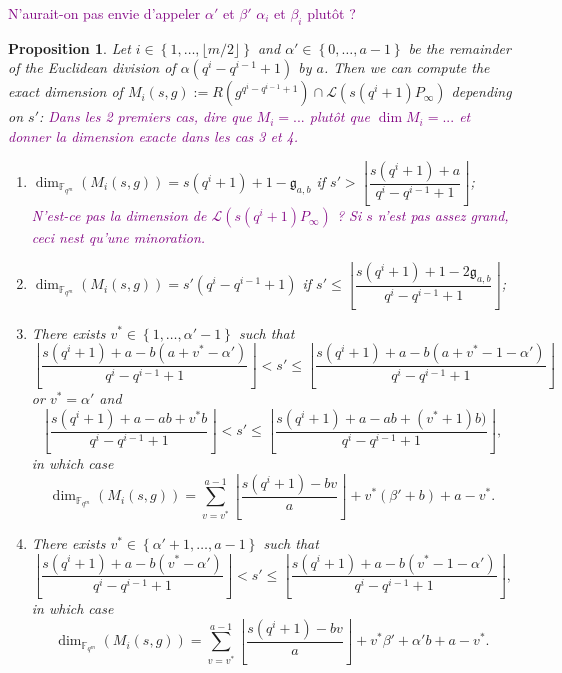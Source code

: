\documentclass[a4paper]{article}
\newtheorem{proposition}[thm]{Proposition}
\theoremstyle{definition}
\theoremstyle{remark}
\newcommand{\calL}{\mathcal{L}}
\newcommand{\fqm}{\mathbb{F}_{q^m}}
\newcommand{\set}[1]{\left\{#1\right\}}
\newcommand\jade[1]{\textcolor{purple}{#1}}
\begin{document}
\jade{N'aurait-on pas envie d'appeler $\alpha'$ et $\beta'$ $\alpha_i$ et $\beta_i$ plutôt ?}
\begin{proposition} \label{prop:dim_M_i's}
Let $i \in \set{1,\dots,\lfloor m/2 \rfloor}$ and
     $\alpha' \in \set{0,\dots,a-1}$ be the remainder of the Euclidean division of $\alpha (q^i-q^{i-1}+1)$ by $a$. Then we can compute the exact dimension of $M_i(s,g) := R(g^{q^{i}-q^{i-1}+1}) \cap \calL(s(q^i+1)P_\infty)$ depending on $s'$:
     \jade{Dans les 2 premiers cas, dire que $M_i=...$ plutôt que $\dim M_i=...$ et donner la dimension exacte dans les cas 3 et 4.}
    \begin{enumerate}
        \item $\dim_{\fqm}(M_i(s,g)) = s(q^i+1)+1-\mathfrak{g}_{a,b}$ if $s' > \left\lfloor \dfrac{s(q^i+1)+a}{q^i-q^{i-1}+1}\right\rfloor$; \jade{N'est-ce pas la dimension de $\calL(s(q^i+1)P_\infty)$ ? Si $s$ n'est pas assez grand, ceci nest qu'une minoration. }
        
        \item $\dim_{\fqm}(M_i(s,g)) = s'(q^i-q^{i-1}+1)$ if $s' \leq \left\lfloor \dfrac{s(q^i+1)+1-2\mathfrak{g}_{a,b}}{q^i-q^{i-1}+1}\right\rfloor$;
        
        \item There exists $v^* \in \set{1,\dots,\alpha'-1}$ such that
        $$ \left\lfloor \dfrac{s(q^i+1)+a-b(a+v^*-\alpha')}{q^i-q^{i-1}+1}\right\rfloor < s' \leq  \left\lfloor \dfrac{s(q^i+1)+a-b(a+v^*-1-\alpha')}{q^i-q^{i-1}+1}\right\rfloor$$ or $v^* = \alpha'$ and 
        $$\left\lfloor \dfrac{s(q^i+1)+a-ab+v^*b}{q^i-q^{i-1}+1}\right\rfloor < s' \leq  \left\lfloor \dfrac{s(q^i+1)+a-ab+(v^*+1)b)}{q^i-q^{i-1}+1}\right\rfloor,$$
        in which case 
          $$\dim_{\fqm}(M_i(s,g)) = \sum\limits_{v=v^*}^{a-1} \left\lfloor \dfrac{s(q^i+1)-bv}{a} \right\rfloor + v^*(\beta'+b) + a-v^*.$$
        
        \item There exists $v^* \in \set{\alpha'+1,\dots,a-1}$ such that
        $$ \left\lfloor \dfrac{s(q^i+1)+a-b(v^*-\alpha')}{q^i-q^{i-1}+1}\right\rfloor < s' \leq  \left\lfloor \dfrac{s(q^i+1)+a-b(v^*-1-\alpha')}{q^i-q^{i-1}+1}\right\rfloor,$$
        in which case 
        $$\dim_{\fqm}(M_i(s,g)) = \sum\limits_{v=v^*}^{a-1} \left\lfloor \dfrac{s(q^i+1)-bv}{a} \right\rfloor + v^*\beta' + \alpha'b +a-v^*.$$
    \end{enumerate}
\end{proposition}
\end{document}
